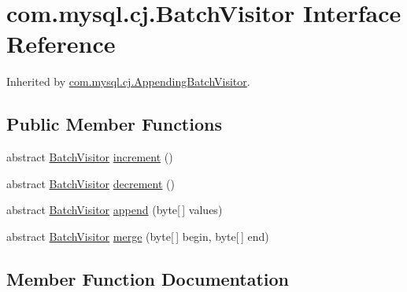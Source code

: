 \hypertarget{interfacecom_1_1mysql_1_1cj_1_1_batch_visitor}{}\section{com.\+mysql.\+cj.\+Batch\+Visitor Interface Reference}
\label{interfacecom_1_1mysql_1_1cj_1_1_batch_visitor}


Inherited by \mbox{\hyperlink{classcom_1_1mysql_1_1cj_1_1_appending_batch_visitor}{com.\+mysql.\+cj.\+Appending\+Batch\+Visitor}}.

\subsection*{Public Member Functions}
\begin{DoxyCompactItemize}
\item 
abstract \mbox{\hyperlink{interfacecom_1_1mysql_1_1cj_1_1_batch_visitor}{Batch\+Visitor}} \mbox{\hyperlink{interfacecom_1_1mysql_1_1cj_1_1_batch_visitor_a4778f6e4d4c046653767d232f547c1f2}{increment}} ()
\item 
abstract \mbox{\hyperlink{interfacecom_1_1mysql_1_1cj_1_1_batch_visitor}{Batch\+Visitor}} \mbox{\hyperlink{interfacecom_1_1mysql_1_1cj_1_1_batch_visitor_ad9fc024937c7d03fe39f3c4f1a6a5069}{decrement}} ()
\item 
abstract \mbox{\hyperlink{interfacecom_1_1mysql_1_1cj_1_1_batch_visitor}{Batch\+Visitor}} \mbox{\hyperlink{interfacecom_1_1mysql_1_1cj_1_1_batch_visitor_a7f758e88adb5d36fe9b47dfbee4377a8}{append}} (byte\mbox{[}$\,$\mbox{]} values)
\item 
abstract \mbox{\hyperlink{interfacecom_1_1mysql_1_1cj_1_1_batch_visitor}{Batch\+Visitor}} \mbox{\hyperlink{interfacecom_1_1mysql_1_1cj_1_1_batch_visitor_a29941741b1d70e0845b7164b8141231a}{merge}} (byte\mbox{[}$\,$\mbox{]} begin, byte\mbox{[}$\,$\mbox{]} end)
\end{DoxyCompactItemize}


\subsection{Member Function Documentation}
\mbox{\label{interfacecom_1_1mysql_1_1cj_1_1_batch_visitor_a7f758e88adb5d36fe9b47dfbee4377a8}} 
